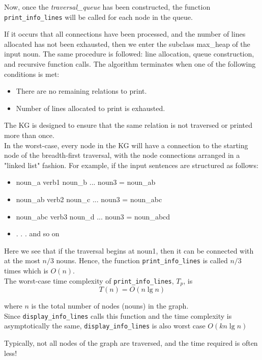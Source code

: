 \documentclass[conference]{IEEEtran}
\begin{document}
Now, once the \textit{traversal\_queue} has been constructed, the function \texttt{print\_info\_lines} will be called for each node in the queue.

If it occurs that all connections have been processed, and the number of lines allocated has not been exhausted, then we enter the subclass max\_heap of the input noun. The same procedure is followed: line allocation, queue construction, and recursive function calls. The algorithm terminates when one of the following conditions is met:
\begin{itemize}
    \item There are no remaining relations to print.
    \item Number of lines allocated to print is exhausted.
\end{itemize}

The KG is designed to ensure that the same relation is not traversed or printed more than once.
\\
In the worst-case, every node in the KG will have a connection to the starting node of the breadth-first traversal, with the node connections arranged in a "linked list" fashion. For example, if the input sentences are structured as follows:
\begin{itemize}
    \item noun\_a verb1 noun\_b     ... noun3 = noun\_ab
    \item noun\_ab verb2 noun\_c	... noun3 = noun\_abc
    \item noun\_abc verb3 noun\_d   ... noun3 = noun\_abcd
    \item . . . and so on
\end{itemize}

Here we see that if the traversal begins at noun1, then it can be connected with at the most $n/3$ nouns. Hence, the function \texttt{print\_info\_lines} is called $n/3$ times which is $O(n)$.
\\The worst-case time complexity of \texttt{print\_info\_lines}, $T_p$, is
\begin{equation}
	T(n) = O(n \lg n)
\end{equation}


where $n$ is the total number of nodes (nouns) in the graph. 
\\
Since \texttt{display\_info\_lines} calls this function and the time complexity is asymptotically the same, \texttt{display\_info\_lines} is also worst case $O(kn \lg n)$

Typically, not all nodes of the graph are traversed, and the time required is often less!
\end{document}
